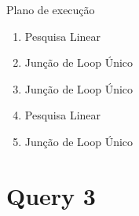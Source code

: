 \documentclass[aspectratio=169]{beamer}
\begin{document}
  \begin{frame}{Plano de execução}
    
    \begin{enumerate}
      \item Pesquisa Linear 
      \item Junção de Loop Único 
      \item Junção de Loop Único 
      \item Pesquisa Linear 
      \item Junção de Loop Único
    \end{enumerate}
  \end{frame}
  \section{Query 3}
\end{document}
